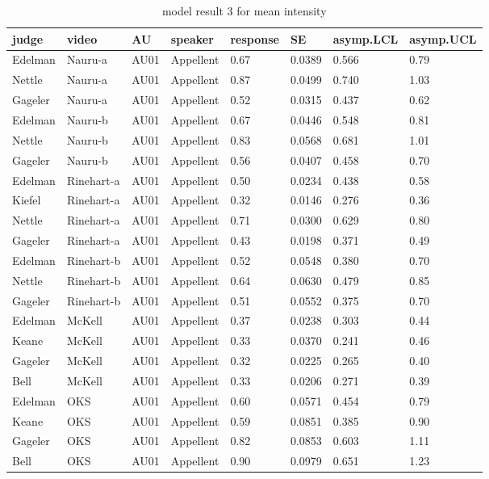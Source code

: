\documentclass{monashthesis}
\begin{document}
\begin{center}
\begin{longtable}{llllllll}
\caption{model result 3 for mean intensity}\\
\toprule
judge & video & AU & speaker & response & SE & asymp.LCL & asymp.UCL \\
\midrule
\endhead
\bottomrule
\endfoot
Edelman & Nauru-a & AU01 & Appellent & 0.67 & 0.0389 & 0.566 & 0.79 \\
Nettle & Nauru-a & AU01 & Appellent & 0.87 & 0.0499 & 0.740 & 1.03 \\
Gageler & Nauru-a & AU01 & Appellent & 0.52 & 0.0315 & 0.437 & 0.62 \\
Edelman & Nauru-b & AU01 & Appellent & 0.67 & 0.0446 & 0.548 & 0.81 \\
Nettle & Nauru-b & AU01 & Appellent & 0.83 & 0.0568 & 0.681 & 1.01 \\
Gageler & Nauru-b & AU01 & Appellent & 0.56 & 0.0407 & 0.458 & 0.70 \\
Edelman & Rinehart-a & AU01 & Appellent & 0.50 & 0.0234 & 0.438 & 0.58 \\
Kiefel & Rinehart-a & AU01 & Appellent & 0.32 & 0.0146 & 0.276 & 0.36 \\
Nettle & Rinehart-a & AU01 & Appellent & 0.71 & 0.0300 & 0.629 & 0.80 \\
Gageler & Rinehart-a & AU01 & Appellent & 0.43 & 0.0198 & 0.371 & 0.49 \\
Edelman & Rinehart-b & AU01 & Appellent & 0.52 & 0.0548 & 0.380 & 0.70 \\
Nettle & Rinehart-b & AU01 & Appellent & 0.64 & 0.0630 & 0.479 & 0.85 \\
Gageler & Rinehart-b & AU01 & Appellent & 0.51 & 0.0552 & 0.375 & 0.70 \\
Edelman & McKell & AU01 & Appellent & 0.37 & 0.0238 & 0.303 & 0.44 \\
Keane & McKell & AU01 & Appellent & 0.33 & 0.0370 & 0.241 & 0.46 \\
Gageler & McKell & AU01 & Appellent & 0.32 & 0.0225 & 0.265 & 0.40 \\
Bell & McKell & AU01 & Appellent & 0.33 & 0.0206 & 0.271 & 0.39 \\
Edelman & OKS & AU01 & Appellent & 0.60 & 0.0571 & 0.454 & 0.79 \\
Keane & OKS & AU01 & Appellent & 0.59 & 0.0851 & 0.385 & 0.90 \\
Gageler & OKS & AU01 & Appellent & 0.82 & 0.0853 & 0.603 & 1.11 \\
Bell & OKS & AU01 & Appellent & 0.90 & 0.0979 & 0.651 & 1.23 \\

\end{longtable}
\end{center}
\end{document}
